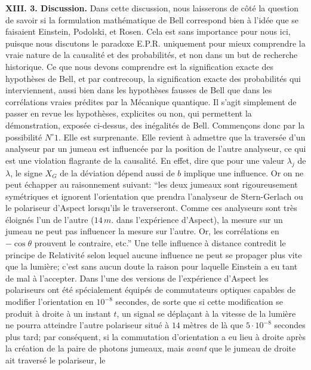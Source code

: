 {\bf XIII. 3. Discussion.}
\medskip
Dans cette discussion, nous laisserons de c\^ot\'e la question de
savoir si la formulation math\'ematique de Bell correspond bien \`a
l'id\'ee que se faisaient Einstein, Podolski, et Rosen. Cela est  
sans importance pour nous ici, puisque nous discutons le paradoxe
E.P.R.  uniquement pour mieux comprendre la vraie nature de la
causalit\'e et des probabilit\'es, et non dans un but de recherche
historique. Ce que  nous devons comprendre est la signification
exacte des hypoth\`eses de Bell, et par contrecoup, la signification
exacte des probabilit\'es qui interviennent, aussi bien dans les
hypoth\`eses fausses de Bell que dans les corr\'elations vraies
pr\'edites par la M\'ecanique quantique. 
\medskip
Il s'agit simplement de passer en revue les hypoth\`eses,  explicites
ou non,  qui permettent la d\'emonstration,  expos\'ee ci-dessus, 
des in\'egalit\'es de Bell.  Commen\c{c}ons donc par la possibilit\'e
$N^\circ 1$.  Elle est surprenante. Elle revient \`a admettre que
la travers\'ee d'un analyseur par un jumeau est influenc\'ee par la  
position de l'autre analyseur, ce qui est une violation flagrante de
la causalit\'e. En effet, dire que pour une valeur $\lambda_j$ de
$\lambda$, le signe $X_G$ de la d\'eviation d\'epend aussi de $b$
implique une influence. Or on ne peut \'echapper au raisonnement
suivant: ``les deux jumeaux sont rigoureusement sym\'etriques et
ignorent l'orientation que prendra l'analyseur de Stern-Gerlach ou
le polariseur d'Aspect lorsqu'ils le traverseront.  Comme ces
ana\-ly\-seurs sont tr\`es \'eloign\'es l'un de  l'autre ($14\, m.$
dans l'exp\'erience d'Aspect), la mesure sur un jumeau ne peut pas
influencer la mesure sur l'autre. Or, les corr\'elations en
$-\cos\theta$ prouvent le contraire, etc.'' Une telle influence \`a
distance contredit le principe de Relativit\'e selon lequel aucune
influence ne peut se propager plus vite que la lumi\`ere; c'est sans
aucun doute la raison pour laquelle Einstein a eu tant de mal \`a 
l'accepter. Dans l'une des versions de l'exp\'erience d'Aspect  les
polariseurs ont \'et\'e  sp\'ecialement \'equip\'es de commutateurs
optiques capables de  modifier l'orientation en $10^{-8}$ secondes, 
de sorte que si cette modification se produit \`a droite \`a un
instant $t$,  un signal se  d\'epla\c{c}ant \`a la vitesse de la
lumi\`ere ne pourra atteindre l'autre polariseur situ\'e \`a $14$
m\`etres de l\`a que $5 \cdot 10^{-8}$  secondes plus tard; par
cons\'equent, si la commutation d'orientation a eu  lieu \`a droite
apr\`es la cr\'eation de la  paire de photons jumeaux,  mais {\it
avant} que le jumeau de droite ait  travers\'e le polariseur,  le
